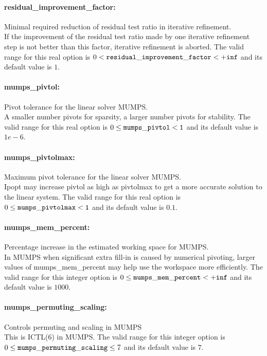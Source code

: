 \paragraph{residual\_improvement\_factor:} Minimal required reduction of residual test ratio in iterative refinement. $\;$ \\
 If the improvement of the residual test ratio
made by one iterative refinement step is not
better than this factor, iterative refinement is
aborted. The valid range for this real option is 
$0 <  {\tt residual\_improvement\_factor } <  {\tt +inf}$
and its default value is $1$.

\paragraph{mumps\_pivtol:} Pivot tolerance for the linear solver MUMPS. \\
A smaller number pivots for sparsity, a larger number pivots for stability.
The valid range for this real option is
$0 \le {\tt mumps\_pivtol } < {\tt 1}$
and its default value is $1e-6$.

\paragraph{mumps\_pivtolmax:} Maximum pivot tolerance for the linear solver MUMPS. \\
Ipopt may increase pivtol as high as pivtolmax to get a more accurate solution to the linear system.
The valid range for this real option is
$0 \le {\tt mumps\_pivtolmax } < {\tt 1}$
and its default value is $0.1$.

\paragraph{mumps\_mem\_percent:} Percentage increase in the estimated working space for MUMPS. \\
In MUMPS when significant extra fill-in is caused by numerical pivoting, larger values of mumps\_mem\_percent may help use the workspace more efficiently.
The valid range for this integer option is
$0 \le {\tt mumps\_mem\_percent } < {\tt +inf}$
and its default value is $1000$.

\paragraph{mumps\_permuting\_scaling:} Controls permuting and scaling in MUMPS $\;$ \\
 This is ICTL(6) in MUMPS. The valid range for this integer option is
$0 \le {\tt mumps\_permuting\_scaling } \le 7$
and its default value is $7$.


